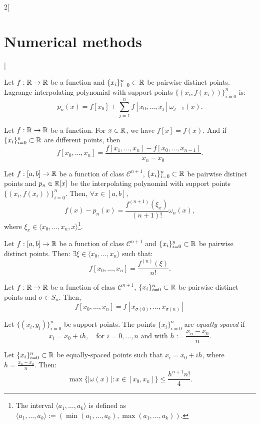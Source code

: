 \documentclass[../../../main.tex]{subfiles}
\begin{document}
\begin{multicols}{2}[\section{Numerical methods}]
\begin{prop}
    Let $f:\mathbb{R}\rightarrow\mathbb{R}$ be a function and $\{x_i\}_{i=0}^n\subset\mathbb{R}$ be pairwise distinct points. Lagrange interpolating polynomial with support points $\{(x_i,f(x_i))\}_{i=0}^n$ is: $$p_n(x)=f[x_0]+\sum_{j=1}^nf[x_0,\ldots,x_j]\omega_{j-1}(x).$$
\end{prop}
\begin{method}
    Let $f:\mathbb{R}\rightarrow\mathbb{R}$ be a function. For $x\in\mathbb{R}$, we have $f[x]=f(x)$. And if $\{x_i\}_{i=0}^n\subset\mathbb{R}$ are different points, then $$f[x_0,\ldots,x_n]=\frac{f[x_1,\ldots,x_n]-f[x_0,\ldots,x_{n-1}]}{x_n-x_0}.$$ 
\end{method}
\begin{theorem}
    Let $f:[a,b]\rightarrow\mathbb{R}$ be a function of class $\mathcal{C}^{n+1}$, $\{x_i\}_{i=0}^n\subset\mathbb{R}$ be pairwise distinct points and $p_n\in\mathbb{R}[x]$ be the interpolating polynomial with support points $\{(x_i,f(x_i))\}_{i=0}^n$. Then, $\forall x\in[a,b]$, $$f(x)-p_n(x)=\frac{f^{(n+1)}(\xi_x)}{(n+1)!}\omega_n(x),$$ where $\xi_x\in\langle x_0,\ldots,x_n,x\rangle$\footnote{The interval $\langle a_1,\ldots,a_k\rangle$ is defined as $\langle a_1,\ldots,a_k\rangle:=(\min(a_1,\ldots,a_k),\max(a_1,\ldots,a_k))$.}.
\end{theorem}
\begin{lemma}
    Let $f:[a,b]\rightarrow\mathbb{R}$ be a function of class $\mathcal{C}^{n+1}$ and $\{x_i\}_{i=0}^n\subset\mathbb{R}$ be pairwise distinct points. Then: $\exists\xi\in\langle x_0,\ldots,x_n\rangle$ such that: $$f[x_0,\ldots,x_n]=\frac{f^{(n)}(\xi)}{n!}.$$ 
\end{lemma}
\begin{prop}
    Let $f:\mathbb{R}\rightarrow\mathbb{R}$ be a function of class $\mathcal{C}^{n+1}$, $\{x_i\}_{i=0}^n\subset\mathbb{R}$ be pairwise distinct points and $\sigma\in S_n$. Then, $$f[x_0,\ldots,x_n]=f[x_{\sigma(0)},\ldots,x_{\sigma(n)}]$$
\end{prop}
\begin{definition}
    Let $\{(x_i,y_i)\}_{i=0}^n$ be support points. The points $\{x_i\}_{i=0}^n$ are \textit{equally-spaced} if $$x_i=x_0+ih,\quad\text{for }i=0,\ldots,n\text{ and with }h:=\frac{x_n-x_0}{n}.$$
\end{definition}
\begin{prop}
    Let $\{x_i\}_{i=0}^n\subset\mathbb{R}$ be equally-spaced points such that $x_i=x_0+ih$, where $h=\frac{x_n-x_0}{n}$. Then:
    $$\max\{|\omega(x)|:x\in[x_0,x_n]\}\leq\frac{h^{n+1}n!}{4}.$$

\end{prop}
\end{multicols}
\end{document}
